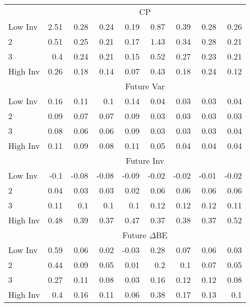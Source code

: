 \begin{table}[!ht]
\begin{tabular}{lrrrrrrrr}
  
    & \multicolumn{8}{c}{CP}  \\
     \cmidrule(r){2-5} \cmidrule(r){6-9}
    Low Inv  & 2.51  & 0.28  & 0.24  & 0.19  & 0.87  & 0.39  & 0.28  & 0.26   \\
    2  & 0.51  & 0.25  & 0.21  & 0.17  & 1.43  & 0.34  & 0.28  & 0.21   \\
    3  & 0.4  & 0.24  & 0.21  & 0.15  & 0.52  & 0.27  & 0.23  & 0.21   \\
    High Inv  & 0.26  & 0.18  & 0.14  & 0.07  & 0.43  & 0.18  & 0.24  & 0.12   \\
  
    & \multicolumn{8}{c}{Future Var}  \\
     \cmidrule(r){2-5} \cmidrule(r){6-9}
    Low Inv  & 0.16  & 0.11  & 0.1  & 0.14  & 0.04  & 0.03  & 0.03  & 0.04   \\
    2  & 0.09  & 0.07  & 0.07  & 0.09  & 0.03  & 0.03  & 0.03  & 0.03   \\
    3  & 0.08  & 0.06  & 0.06  & 0.09  & 0.03  & 0.03  & 0.03  & 0.04   \\
    High Inv  & 0.11  & 0.09  & 0.08  & 0.11  & 0.05  & 0.04  & 0.04  & 0.04   \\
  
    & \multicolumn{8}{c}{Future Inv}  \\
     \cmidrule(r){2-5} \cmidrule(r){6-9}
    Low Inv  & -0.1  & -0.08  & -0.08  & -0.09  & -0.02  & -0.02  & -0.01  & -0.02   \\
    2  & 0.04  & 0.03  & 0.03  & 0.02  & 0.06  & 0.06  & 0.06  & 0.06   \\
    3  & 0.11  & 0.1  & 0.1  & 0.1  & 0.12  & 0.12  & 0.12  & 0.11   \\
    High Inv  & 0.48  & 0.39  & 0.37  & 0.47  & 0.37  & 0.38  & 0.37  & 0.52   \\
    
  
    & \multicolumn{8}{c}{Future $\Delta\text{BE}$}  \\
     \cmidrule(r){2-5} \cmidrule(r){6-9}
    Low Inv  & 0.59  & 0.06  & 0.02  & -0.03  & 0.28  & 0.07  & 0.06  & 0.03   \\
    2  & 0.44  & 0.09  & 0.05  & 0.01  & 0.2  & 0.1  & 0.07  & 0.05   \\
    3  & 0.27  & 0.11  & 0.08  & 0.03  & 0.16  & 0.12  & 0.12  & 0.08   \\
    High Inv  & 0.4  & 0.16  & 0.11  & 0.06  & 0.38  & 0.17  & 0.13  & 0.1   \\
    
  
  \bottomrule
\end{tabular}
\label{tbl:Size_BM_Inv_chars}
\end{table}